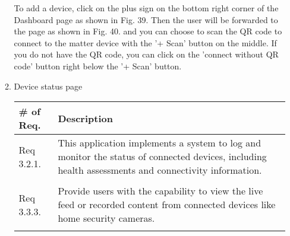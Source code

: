 \begin{enumerate}[label=\arabic*.]
\begin{enumerate}[label*={\arabic*.},ref=\theenumi.\arabic*]
                    To add a device, click on the plus sign on the bottom right corner of the Dashboard page as shown in Fig. 39. Then the user will be forwarded to the page as shown in Fig. 40. and you can choose to scan the QR code to connect to the matter device with the '+ Scan' button on the middle. If you do not have the QR code, you can click on the 'connect without QR code' button right below the '+ Scan' button. \\
                    \newpage
              \item Device status page
                    \begin{table}[H]
                        \center
                        \begin{tabular}{m{1.4cm} m{5.5cm}}
                            \toprule
                            \# of Req. & Description                                                                                                                                         \\
                            \midrule
                            Req 3.2.1. & This application implements a system to log and monitor the status of connected devices, including health assessments and connectivity information. \\\\
                            Req 3.3.3. & Provide users with the capability to view the live feed or recorded content from connected devices like home security cameras.                      \\\\
                            \bottomrule
                        \end{tabular}
                    \end{table}


\end{enumerate}
\end{enumerate}
